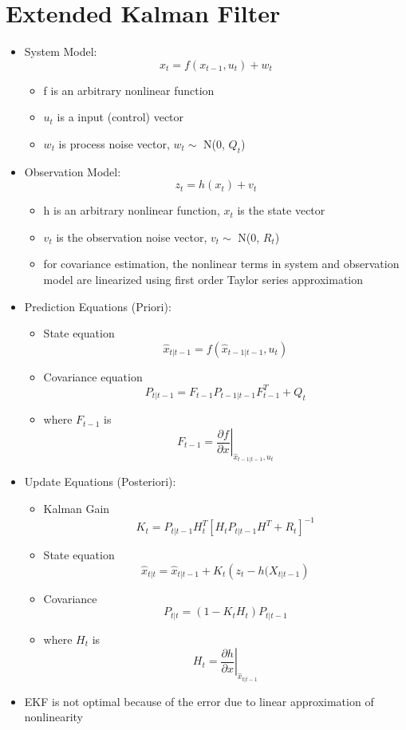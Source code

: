 \documentclass{article}
\begin{document}
\section{Extended Kalman Filter}
 \begin{itemize}
\item System Model: $$x_{t} = f(x_{t-1},  u_t)+ w_t$$
\begin{itemize}
\item f is an arbitrary nonlinear function 
\item $u_t$ is a input (control) vector
\item $w_t$ is process noise vector, $w_t \sim$ N(0, $Q_t$)
\end{itemize}

\item Observation Model: $$z_{t} = h(x_{t}) + v_t$$
\begin{itemize}
\item h is an arbitrary nonlinear function, $x_{t}$ is the state vector
\item $v_{t}$ is the observation noise vector, $v_t \sim$ N(0, $R_t$)
\item for covariance estimation, the nonlinear terms in system and observation model are linearized using first order Taylor series approximation
\end{itemize}
\item Prediction Equations (Priori):
\begin{itemize}
\item State equation  $$\hat x_{t|t-1}=f(\hat x_{t-1|t-1},u_{t})$$
\item Covariance equation $$P_{t|t-1} = F_{t-1} P_{t-1|t-1}F_{t-1}^T + Q_t$$
\item where $F_{t-1}$ is $$F_{t-1} =\left. \frac{\partial f}{\partial x} \right |_{\hat x_{t-1|t-1},u_t}$$
\end{itemize}
\item Update Equations (Posteriori):
\begin{itemize}
\item Kalman Gain $$K_t=P_{t|t-1}H_t^T \left [ H_tP_{t|t-1}H^T+R_t\right]^{-1}$$
\item State equation $$\hat x_{t|t}=\hat x_{t|t-1} + K_t\left( z_t-h(X_{t|t-1}\right)$$
\item Covariance $$P_{t|t} = \left( 1-K_tH_t\right ) P_{t|t-1}$$
\item where $H_t$ is $$H_t =\left. \frac{\partial h}{\partial x} \right |_{\hat x_{t|t-1}}$$
\end{itemize}
\item EKF is not optimal because of the error due to linear approximation of nonlinearity

\end{itemize}
\end{document}
